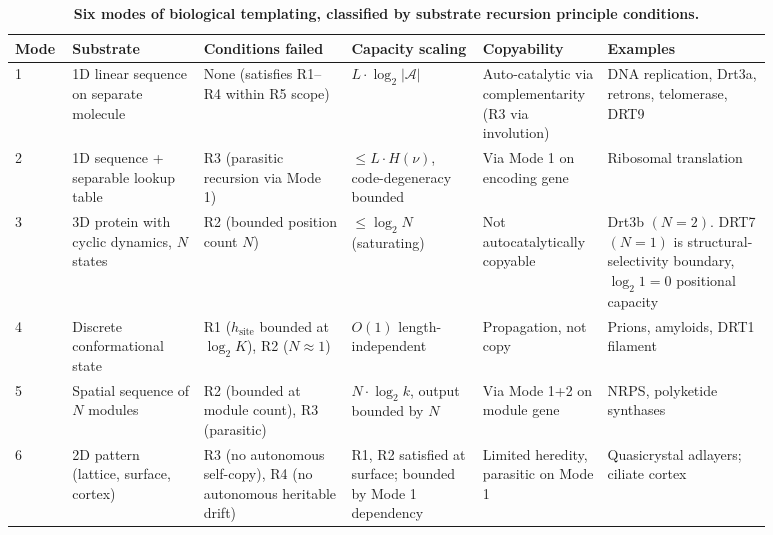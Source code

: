\documentclass[aps,prx,reprint,amsmath,amssymb,floatfix,superscriptaddress,nofootinbib]{revtex4-2}
\theoremstyle{plain-thm}
\theoremstyle{definition-thm}
\begin{document}
\begin{table}
\caption{\textbf{Six modes of biological templating, classified by substrate recursion principle conditions.}}
\label{tab:modes}
\begin{tabular}{p{0.05\linewidth} p{0.16\linewidth} p{0.18\linewidth} p{0.16\linewidth} p{0.13\linewidth} p{0.20\linewidth}}
\toprule
Mode & Substrate & Conditions failed & Capacity scaling & Copyability & Examples \\
\midrule
1 & 1D linear sequence on separate molecule & None (satisfies R1--R4 within R5 scope) & $L \cdot \log_2 |\mathcal{A}|$ & Auto-catalytic via complementarity (R3 via involution) & DNA replication, Drt3a, retrons, telomerase, DRT9 \\
2 & 1D sequence + separable lookup table & R3 (parasitic recursion via Mode 1) & $\le L \cdot H(\nu)$, code-degeneracy bounded & Via Mode 1 on encoding gene & Ribosomal translation \\
3 & 3D protein with cyclic dynamics, $N$ states & R2 (bounded position count $N$) & $\le \log_2 N$ (saturating) & Not autocatalytically copyable & Drt3b $(N=2)$. DRT7 $(N=1)$ is structural-selectivity boundary, $\log_2 1 = 0$ positional capacity \\
4 & Discrete conformational state & R1 ($h_{\mathrm{site}}$ bounded at $\log_2 K$), R2 ($N \approx 1$) & $O(1)$ length-independent & Propagation, not copy & Prions, amyloids, DRT1 filament \\
5 & Spatial sequence of $N$ modules & R2 (bounded at module count), R3 (parasitic) & $N \cdot \log_2 k$, output bounded by $N$ & Via Mode 1+2 on module gene & NRPS, polyketide synthases \\
6 & 2D pattern (lattice, surface, cortex) & R3 (no autonomous self-copy), R4 (no autonomous heritable drift) & R1, R2 satisfied at surface; bounded by Mode 1 dependency & Limited heredity, parasitic on Mode 1 & Quasicrystal adlayers; ciliate cortex \\
\bottomrule
\end{tabular}
\end{table}
\end{document}
